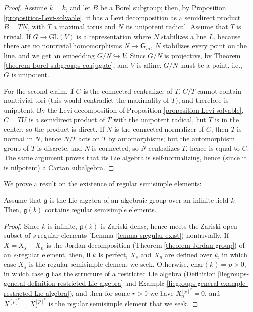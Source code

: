 \begin{proof}
 Assume $k=\bar k$, and let $B$ be a Borel subgroup; then, by Proposition \ref{proposition-Levi-solvable}, it has a Levi decomposition as a semidirect product  $B=T N$, with $T$ a maximal torus and $N$ its unipotent radical. Assume that $T$ is trivial. If $G\to \text{GL}(V)$ is a representation where $N$ stabilizes a line $L$, because there are no nontrivial homomorphisms $N\to\mathbf{G}_m$, $N$ stabilizes every point on the line, and we get an embedding $G/N\hookrightarrow V$. Since $G/N$ is projective, by Theorem \ref{theorem-Borel-subgroups-conjugate}, and $V$ is affine, $G/N$ must be a point, i.e., $G$ is unipotent.
 
 For the second claim, if $C$ is the connected centralizer of $T$, $C/T$ cannot contain nontrivial tori (this would contradict the maximality of $T$), and therefore is unipotent. By the Levi decomposition of Proposition \ref{proposition-Levi-solvable}, $C=TU$ is a semidirect product of $T$ with the unipotent radical, but $T$ is in the center, so the product is direct. If $N$ is the connected normalizer of $C$, then $T$ is normal in $N$, hence $N/T$ acts on $T$ by automorphisms; but the automorphism group of $T$ is discrete, and $N$ is connected, so $N$ centralizes $T$, hence is equal to $C$. The same argument proves that its Lie algebra is self-normalizing, hence (since it is nilpotent) a Cartan subalgebra.
\end{proof}



We prove a result on the existence of regular semisimple elements:

\begin{lemma}
 \label{lemma-regular-semisimple-exist}
Assume that $\mathfrak g$ is the Lie algebra of an algebraic group over an infinite field $k$. Then, $\mathfrak g(k)$ contains regular semisimple elements. 
\end{lemma}

\begin{proof}
 Since $k$ is infinite, $\mathfrak g(k)$ is Zariski dense, hence meets the Zariski open subset of $s$-regular elements (Lemma \ref{lemma-sregular-exist}) nontrivially. If $X=X_s+X_n$ is the Jordan decomposition (Theorem \ref{theorem-Jordan-group}) of an $s$-regular element, then, if $k$ is perfect, $X_s$ and $X_n$ are defined over $k$, in which case $X_s$ is the regular semisimple element we seek. Otherwise, $\text{char}(k)=p>0$, in which case $\mathfrak g$ has the structure of a restricted Lie algebra (Definition \ref{liegroups-general-definition-restricted-Lie-algebra} and Example \ref{liegroups-general-example-restricted-Lie-algebra}), and then for some $r>0$ we have $X_n^{[p]^r}=0$, and $X^{[p]^r}=X_s^{[p]^r}$ is the regular semisimple element that we seek.
\end{proof}



